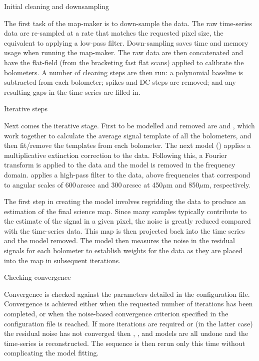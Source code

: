 \documentclass[11pt,oneside,chapters]{starlink}
\begin{document}
\begin{enumdesc}
\item[Initial cleaning and downsampling]

  The first task of the map-maker is to down-sample the data. The raw
  time-series data are re-sampled at a rate that matches the requested
  pixel size, the equivalent to applying a low-pass filter.
  Down-sampling saves time and memory usage when running the
  map-maker.  The raw data are then concatenated and have the
  flat-field (from the bracketing fast flat scans) applied to
  calibrate the bolometers. A number of cleaning steps are then run: a
  polynomial baseline is subtracted from each bolometer; spikes and DC
  steps are removed; and any resulting gaps in the time-series are
  filled in.

\item[Iterative steps]

  Next comes the iterative stage. First to be modelled and removed are
   and , which work together to calculate the
  average signal template of all the bolometers, and then fit/remove
  the templates from each bolometer. The next model ()
  applies a multiplicative extinction correction to the
  data. Following this, a Fourier transform is applied to the data and
  the  model is removed in the frequency domain.
   applies a high-pass filter to the data, above
  frequencies that correspond to angular scales of 600\,arcsec and
  300\,arcsec at 450$\mu$m and 850$\mu$m, respectively.


  The first step in creating the  model involves regridding
  the data to produce an estimation of the final science map.  Since
  many samples typically contribute to the estimate of the signal in a
  given pixel, the noise is greatly reduced compared with the
  time-series data. This map is then projected back into the time
  series and the  model removed. The  model then
  measures the noise in the residual signals for each bolometer to
  establish weights for the data as they are placed into the map in
  subsequent iterations.


\item[Checking convergence]

  Convergence is checked against the parameters detailed in the
  configuration file. Convergence is achieved either when the
  requested number of iterations has been completed, or when the
  noise-based convergence criterion specified in the configuration
  file is reached. If more iterations are required or (in the latter
  case) the residual noise has not converged then ,
  ,  and  models are all undone and
  the time-series is reconstructed. The sequence is then rerun only
  this time without  complicating the model fitting.
\end{enumdesc}
\end{document}

